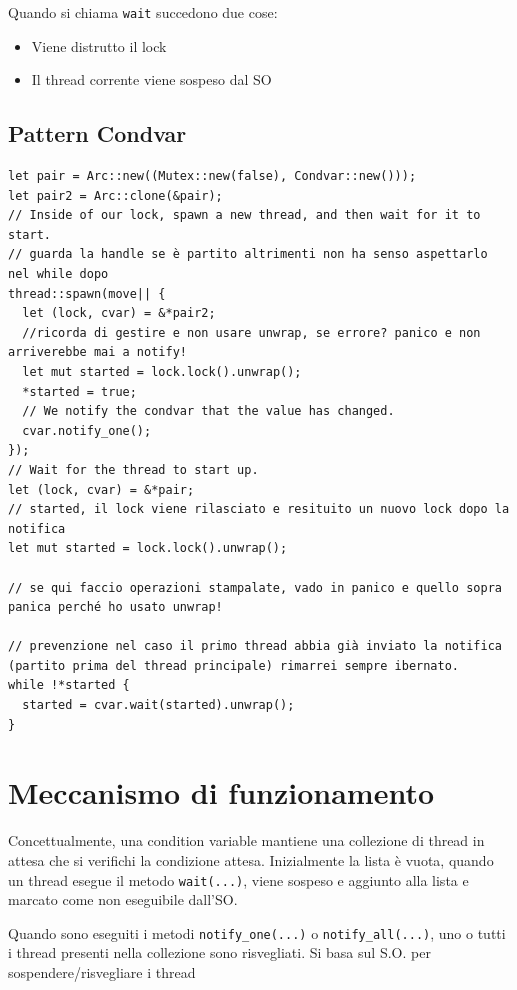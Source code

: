 Quando si chiama \verb|wait| succedono due cose:
\begin{itemize}
  \item Viene distrutto il lock
  \item Il thread corrente viene sospeso dal SO
\end{itemize}


\subsection{Pattern Condvar}


\begin{verbatim}
let pair = Arc::new((Mutex::new(false), Condvar::new()));
let pair2 = Arc::clone(&pair);
// Inside of our lock, spawn a new thread, and then wait for it to start.
// guarda la handle se è partito altrimenti non ha senso aspettarlo nel while dopo
thread::spawn(move|| {
  let (lock, cvar) = &*pair2;
  //ricorda di gestire e non usare unwrap, se errore? panico e non arriverebbe mai a notify!
  let mut started = lock.lock().unwrap();
  *started = true;
  // We notify the condvar that the value has changed.
  cvar.notify_one();
});
// Wait for the thread to start up.
let (lock, cvar) = &*pair;
// started, il lock viene rilasciato e resituito un nuovo lock dopo la notifica
let mut started = lock.lock().unwrap();

// se qui faccio operazioni stampalate, vado in panico e quello sopra panica perché ho usato unwrap!

// prevenzione nel caso il primo thread abbia già inviato la notifica (partito prima del thread principale) rimarrei sempre ibernato.
while !*started {
  started = cvar.wait(started).unwrap();
}
\end{verbatim}


\section{Meccanismo di funzionamento}

Concettualmente, una condition variable mantiene una collezione di thread in
attesa che si verifichi la condizione attesa.
Inizialmente la lista è vuota, quando un thread esegue il metodo \verb|wait(...)|, viene sospeso e aggiunto alla lista e marcato come non eseguibile dall'SO.


Quando sono eseguiti i metodi \verb|notify_one(...)| o \verb|notify_all(...)|, uno o tutti i
thread presenti nella collezione sono risvegliati. Si basa sul S.O. per sospendere/risvegliare i thread


